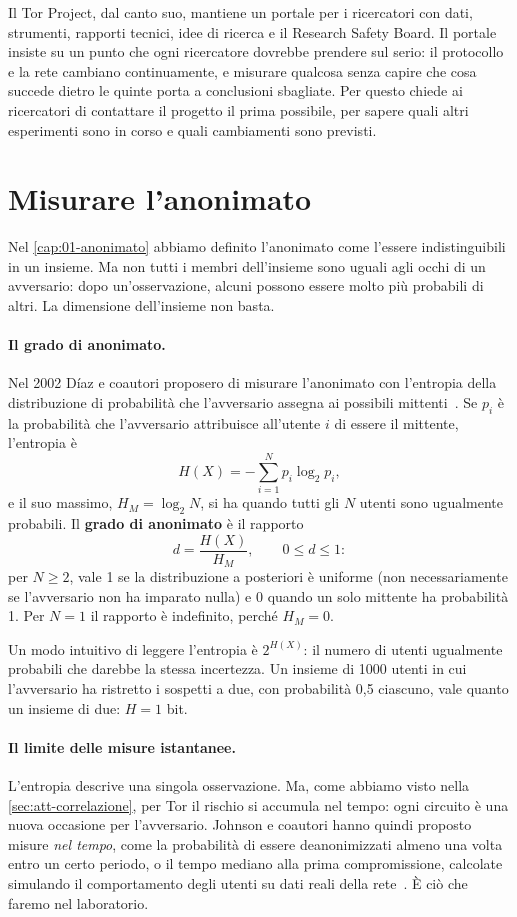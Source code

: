 Il Tor Project, dal canto suo, mantiene un portale per i ricercatori con dati, strumenti, rapporti tecnici, idee di ricerca e il Research Safety Board. Il portale insiste su un punto che ogni ricercatore dovrebbe prendere sul serio: il protocollo e la rete cambiano continuamente, e misurare qualcosa senza capire che cosa succede dietro le quinte porta a conclusioni sbagliate. Per questo chiede ai ricercatori di contattare il progetto il prima possibile, per sapere quali altri esperimenti sono in corso e quali cambiamenti sono previsti.

\section{Misurare l'anonimato}\label{sec:ric-metriche}

Nel \cref{cap:01-anonimato} abbiamo definito l'anonimato come l'essere indistinguibili in un insieme. Ma non tutti i membri dell'insieme sono uguali agli occhi di un avversario: dopo un'osservazione, alcuni possono essere molto più probabili di altri. La dimensione dell'insieme non basta.

\paragraph{Il grado di anonimato.} Nel 2002 Díaz e coautori proposero di misurare l'anonimato con l'entropia della distribuzione di probabilità che l'avversario assegna ai possibili mittenti~\cite{diaz2002measuring}. Se $p_i$ è la probabilità che l'avversario attribuisce all'utente $i$ di essere il mittente, l'entropia è
\[ H(X) = -\sum_{i=1}^{N} p_i \log_2 p_i, \]
e il suo massimo, $H_M = \log_2 N$, si ha quando tutti gli $N$ utenti sono ugualmente probabili. Il \textbf{grado di anonimato} è il rapporto
\[ d = \frac{H(X)}{H_M}, \qquad 0 \le d \le 1: \]
per $N\ge 2$, vale 1 se la distribuzione a posteriori è uniforme (non necessariamente se l'avversario non ha imparato nulla) e 0 quando un solo mittente ha probabilità 1. Per $N=1$ il rapporto è indefinito, perché $H_M=0$.

Un modo intuitivo di leggere l'entropia è $2^{H(X)}$: il numero di utenti ugualmente probabili che darebbe la stessa incertezza. Un insieme di 1000 utenti in cui l'avversario ha ristretto i sospetti a due, con probabilità 0,5 ciascuno, vale quanto un insieme di due: $H = 1$ bit.

\paragraph{Il limite delle misure istantanee.} L'entropia descrive una singola osservazione. Ma, come abbiamo visto nella \cref{sec:att-correlazione}, per Tor il rischio si accumula nel tempo: ogni circuito è una nuova occasione per l'avversario. Johnson e coautori hanno quindi proposto misure \emph{nel tempo}, come la probabilità di essere deanonimizzati almeno una volta entro un certo periodo, o il tempo mediano alla prima compromissione, calcolate simulando il comportamento degli utenti su dati reali della rete~\cite{johnson2013users}. È ciò che faremo nel laboratorio.

